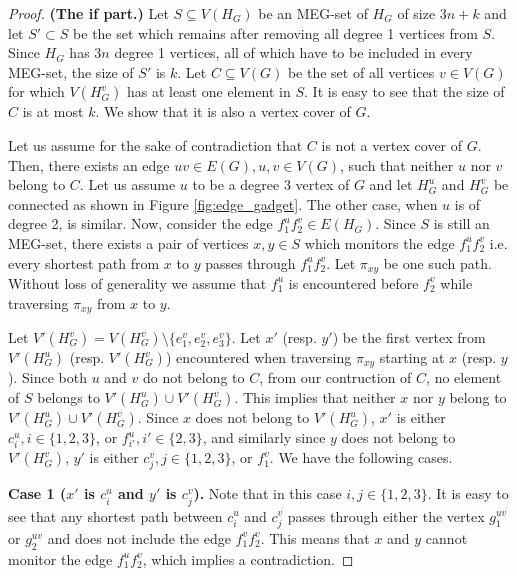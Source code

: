\documentclass[10pt,a4paper]{article}
\begin{document}
\begin{proof}
    \textbf{(The if part.)} Let $S \subseteq V(H_G)$ be an MEG-set of $H_G$ of size $3n + k$ and let $S' \subset S$ be the set which remains after removing all degree 1 vertices from $S$. Since $H_G$ has $3n$ degree 1 vertices, all of which have to be included in every MEG-set, the size of $S'$ is $k$. Let $C \subseteq V(G)$ be the set of all vertices $v \in V(G)$ for which $V(H_G^v)$ has at least one element in $S$. It is easy to see that the size of $C$ is at most $k$. We show that it is also a vertex cover of $G$.

    Let us assume for the sake of contradiction that $C$ is not a vertex cover of $G$. Then, there exists an edge $uv \in E(G), u, v \in V(G)$, such that neither $u$ nor $v$ belong to $C$. Let us assume $u$ to be a degree 3 vertex of $G$ and let $H_G^u$ and $H_G^v$ be connected as shown in Figure \ref{fig:edge_gadget}. The other case, when $u$ is of degree 2, is similar. Now, consider the edge $f_1^u f_2^v \in E(H_G)$. Since $S$ is still an MEG-set, there exists a pair of vertices $x, y \in S$ which monitors the edge $f_1^u f_2^v$ i.e. every shortest path from $x$ to $y$ passes through $f_1^u f_2^v$. Let $\pi_{xy}$ be one such path. Without loss of generality we assume that $f_1^u$ is encountered before $f_2^v$ while traversing $\pi_{xy}$ from $x$ to $y$.

    Let $V'(H_G^v) = V(H_G^v) \setminus \{e_1^v, e_2^v, e_3^v\}$. Let $x'$ (resp. $y'$) be the first vertex from $V'(H_G^u)$ (resp. $V'(H_G^v)$) encountered when traversing $\pi_{xy}$ starting at $x$ (resp. $y$). Since both $u$ and $v$ do not belong to $C$, from our contruction of $C$, no element of $S$ belongs to $V'(H_G^u) \cup V'(H_G^v)$. This implies that neither $x$ nor $y$ belong to $V'(H_G^u) \cup V'(H_G^v)$. Since $x$ does not belong to $V'(H_G^u)$, $x'$ is either $c_i^u, i \in \{1,2,3\}$, or $f_{i'}^u, i' \in \{2, 3\}$, and similarly since $y$ does not belong to $V'(H_G^v)$, $y'$ is either $c_j^v, j \in \{1,2,3\}$, or $f_1^v$. We have the following cases.
   
    \smallskip \noindent \textbf{Case 1 ($x'$ is $c_i^u$ and $y'$ is $c_j^v$).} Note that in this case $i, j \in \{1,2,3\}$. It is easy to see that any shortest path between $c_i^u$ and $c_j^v$ passes through either the vertex $g_1^{uv}$ or $g_2^{uv}$ and does not include the edge $f_1^v f_2^v$. This means that $x$ and $y$ cannot monitor the edge $f_1^u f_2^v$, which implies a contradiction.
    

\end{proof}
\end{document}
